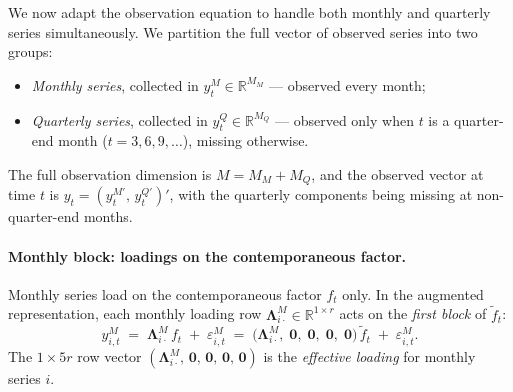 \documentclass[11pt, a4paper, oneside]{article}
\newcommand{\mL}{\boldsymbol{\Lambda}}
\begin{document}
We now adapt the observation equation to handle both monthly and
quarterly series simultaneously. We partition the full vector of
observed series into two groups:
\begin{itemize}[leftmargin=1.5em, itemsep=2pt]
    \item \emph{Monthly series}, collected in $y^M_t \in \mathbb{R}^{M_M}$
          — observed every month;
    \item \emph{Quarterly series}, collected in $y^Q_t \in \mathbb{R}^{M_Q}$
          — observed only when $t$ is a quarter-end month
          ($t = 3, 6, 9, \ldots$), missing otherwise.
\end{itemize}
The full observation dimension is $M = M_M + M_Q$, and the observed
vector at time $t$ is $y_t = (y^{M\prime}_t,\, y^{Q\prime}_t)'$, with
the quarterly components being missing at non-quarter-end months.

\paragraph{Monthly block: loadings on the contemporaneous factor.}
Monthly series load on the contemporaneous factor $f_t$ only. In the
augmented representation, each monthly loading row
$\mL^M_{i\cdot} \in \mathbb{R}^{1 \times r}$ acts on the \emph{first
block} of $\tilde{f}_t$:
\[
y^M_{i,t} \;=\; \mL^M_{i\cdot}\, f_t \;+\; \varepsilon^M_{i,t}
\;=\; \big(\mL^M_{i\cdot},\; \mathbf{0},\; \mathbf{0},\; \mathbf{0},\; \mathbf{0}\big)\, \tilde{f}_t \;+\; \varepsilon^M_{i,t}.
\]
The $1 \times 5r$ row vector
$(\mL^M_{i\cdot},\, \mathbf{0},\, \mathbf{0},\, \mathbf{0},\, \mathbf{0})$
is the \emph{effective loading} for monthly series $i$.
\end{document}
